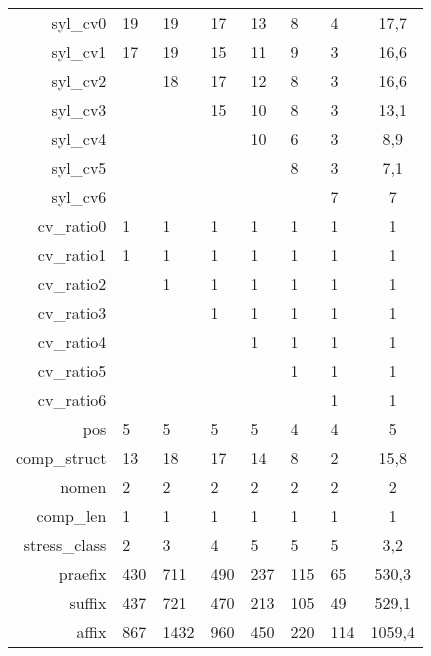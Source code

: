 \begin{longtable}{|r|llllll|c|}
    syl\_cv0          & 19   & 19   & 17   & 13   & 8    & 4    & 17,7     \\
    syl\_cv1          & 17   & 19   & 15   & 11   & 9    & 3    & 16,6     \\
    syl\_cv2          & ~    & 18   & 17   & 12   & 8    & 3    & 16,6     \\
    syl\_cv3          & ~    & ~    & 15   & 10   & 8    & 3    & 13,1     \\
    syl\_cv4          & ~    & ~    & ~    & 10   & 6    & 3    & 8,9      \\
    syl\_cv5          & ~    & ~    & ~    & ~    & 8    & 3    & 7,1      \\
    syl\_cv6          & ~    & ~    & ~    & ~    & ~    & 7    & 7        \\
    cv\_ratio0        & 1    & 1    & 1    & 1    & 1    & 1    & 1        \\
    cv\_ratio1        & 1    & 1    & 1    & 1    & 1    & 1    & 1        \\
    cv\_ratio2        & ~    & 1    & 1    & 1    & 1    & 1    & 1        \\
    cv\_ratio3        & ~    & ~    & 1    & 1    & 1    & 1    & 1        \\
    cv\_ratio4        & ~    & ~    & ~    & 1    & 1    & 1    & 1        \\
    cv\_ratio5        & ~    & ~    & ~    & ~    & 1    & 1    & 1        \\
    cv\_ratio6        & ~    & ~    & ~    & ~    & ~    & 1    & 1        \\
    pos               & 5    & 5    & 5    & 5    & 4    & 4    & 5        \\
    comp\_struct      & 13   & 18   & 17   & 14   & 8    & 2    & 15,8     \\
    nomen             & 2    & 2    & 2    & 2    & 2    & 2    & 2        \\
    comp\_len         & 1    & 1    & 1    & 1    & 1    & 1    & 1        \\
    stress\_class     & 2    & 3    & 4    & 5    & 5    & 5    & 3,2      \\ \hline
    praefix           & 430  & 711  & 490  & 237  & 115  & 65   & 530,3    \\
    suffix            & 437  & 721  & 470  & 213  & 105  & 49   & 529,1    \\
    affix             & 867  & 1432 & 960  & 450  & 220  & 114  & 1059,4   \\

\end{longtable}
